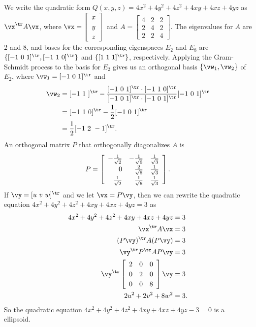 \begin{example}
	\item  We write the quadratic form $Q(x,y,z)=4x^2+4y^2+4z^2+4xy+4xz+4yz$ as $\vx^{\tr} A \vx$, where $\vx = \left[ \begin{array}{c} x\\y\\z \end{array} \right]$ and $A = \left[ \begin{array}{ccc} 4&2&2\\2&4&2\\2&2&4 \end{array} \right]$. The eigenvalues for $A$ are $2$ and $8$, and bases for the corresponding eigenspaces $E_2$ and $E_8$ are $\{[-1 \ 0 \ 1]^{\tr}, [-1 \ 1\ 0]^{\tr}\}$ and $\{[1 \ 1\ 1]^{\tr}\}$, respectively. Applying the Gram-Schmidt process to the basis for $E_2$ gives us an orthogonal basis $\{\vw_1, \vw_2\}$ of $E_2$, where $\vw_1 = [-1 \ 0 \ 1]^{\tr}$ and 
\begin{align*}
\vw_2 &=  [-1 \ 1 \ ]^{\tr} - \frac{ [-1 \ 0 \ 1]^{\tr} \cdot [-1 \ 1 \ 0]^{\tr}}{[-1 \ 0 \ 1]^{\tr} \cdot [-1 \ 0 \ 1]^{\tr}} [-1 \ 0 \ 1]^{\tr} \\
	&=  [-1 \ 1 \ 0]^{\tr} - \frac{1}{2}[-1 \ 0 \ 1]^{\tr} \\
	&= \frac{1}{2}[ -1 \ 2 \ -1]^{\tr}.
\end{align*}
An orthogonal matrix $P$ that orthogonally diagonalizes $A$ is 
\[P = \left[\renewcommand{\arraystretch}{1.2} \begin{array}{rrc} -\frac{1}{\sqrt{2}}&-\frac{1}{\sqrt{6}}&\frac{1}{\sqrt{3}} \\ 0&\frac{2}{\sqrt{6}}&\frac{1}{\sqrt{3}} \\ \frac{1}{\sqrt{2}}&-\frac{1}{\sqrt{6}}&\frac{1}{\sqrt{3}} \end{array} \right].\]
If $\vy =  [u \ v \ w]^{\tr}$ and we let $\vx = P\vy$, then we can rewrite the quadratic equation $4x^2+4y^2+4z^2+4xy+4xz+4yz = 3$ as 
\begin{align*}
4x^2+4y^2+4z^2+4xy+4xz+4yz &= 3 \\
\vx^{\tr}A\vx &= 3 \\
(P\vy)^{\tr}A(P\vy) &= 3 \\
\vy^{\tr} P^{\tr}AP \vy &= 3 \\
\vy^{\tr} \left[ \begin{array}{ccc} 2&0&0\\0&2&0\\0&0&8 \end{array} \right] \vy &= 3 \\
2u^2+2v^2+8w^2 &= 3.
\end{align*}
So the quadratic equation $4x^2+4y^2+4z^2+4xy+4xz+4yz-3 = 0$ is a ellipsoid.  

	\ea


\end{example}

